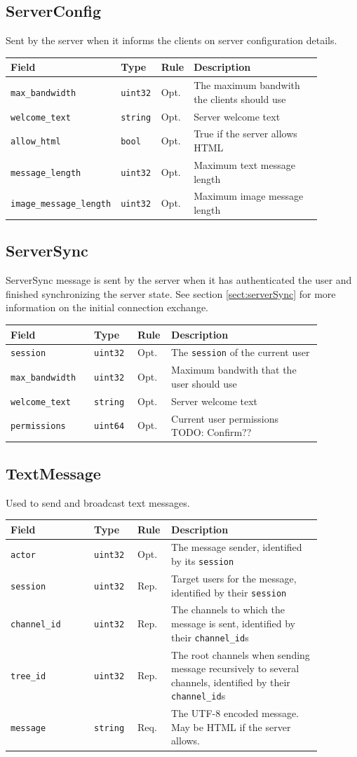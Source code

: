 \documentclass[11pt]{article} %
\newenvironment{mumbleMessageEx}
{%
	\small
	\renewcommand\arraystretch{1.5}
	\begin{tabular}{p{0.25\linewidth}p{0.13\linewidth}p{0.05\linewidth}p{0.45\linewidth}}
	Field & Type & Rule & Description \\
	\hline
}
{%
	\end{tabular}
	\renewcommand\arraystretch{1.0}
}
\newcommand{\mumbleMessageExItem}[4]{ \texttt{#1} & \texttt{#2} & #3 & #4 \\ }
\begin{document}
\subsection{ServerConfig}
\label{msg:serverConfig}

Sent by the server when it informs the clients on server configuration details.

\begin{mumbleMessageEx}
\mumbleMessageExItem{max\_bandwidth}{uint32}{Opt.}{The maximum bandwith the clients should use}
\mumbleMessageExItem{welcome\_text}{string}{Opt.}{Server welcome text}
\mumbleMessageExItem{allow\_html}{bool}{Opt.}{True if the server allows HTML}
\mumbleMessageExItem{message\_length}{uint32}{Opt.}{Maximum text message length}
\mumbleMessageExItem{image\_message\_length}{uint32}{Opt.}{Maximum image message length}
\end{mumbleMessageEx}

\subsection{ServerSync}
\label{msg:serverSync}

ServerSync message is sent by the server when it has authenticated the user and finished synchronizing the server state. See section \ref{sect:serverSync} for more information on the initial connection exchange.

\begin{mumbleMessageEx}
\mumbleMessageExItem{session}{uint32}{Opt.}{The \texttt{session} of the current user}
\mumbleMessageExItem{max\_bandwidth}{uint32}{Opt.}{Maximum bandwith that the user should use}
\mumbleMessageExItem{welcome\_text}{string}{Opt.}{Server welcome text}
\mumbleMessageExItem{permissions}{uint64}{Opt.}{Current user permissions TODO: Confirm??}
\end{mumbleMessageEx}

\subsection{TextMessage}
\label{msg:textMessage}

Used to send and broadcast text messages.

\begin{mumbleMessageEx}
\mumbleMessageExItem{actor}{uint32}{Opt.}{The message sender, identified by its \texttt{session}}
\mumbleMessageExItem{session}{uint32}{Rep.}{Target users for the message, identified by their \texttt{session}}
\mumbleMessageExItem{channel\_id}{uint32}{Rep.}{The channels to which the message is sent, identified by their \texttt{channel\_id}s}
\mumbleMessageExItem{tree\_id}{uint32}{Rep.}{The root channels when sending message recursively to several channels, identified by their \texttt{channel\_id}s}
\mumbleMessageExItem{message}{string}{Req.}{The UTF-8 encoded message. May be HTML if the server allows.}
\end{mumbleMessageEx}
\end{document}
